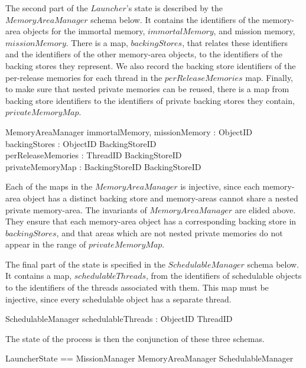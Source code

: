The second part of the $Launcher$'s state is described by the
$MemoryAreaManager$ schema below.
It contains the identifiers of the memory-area objects for the
immortal memory, $immortalMemory$, and mission memory,
$missionMemory$.
There is a map, $backingStores$, that relates these identifiers and
the identifiers of the other memory-area objects, to the identifiers
of the backing stores they represent.
We also record the backing store identifiers of the per-release
memories for each thread in the $perReleaseMemories$ map.
Finally, to make sure that nested private memories can be reused,
there is a map from backing store identifiers to the identifiers of
private backing stores they contain, $privateMemoryMap$.
\begin{schema}{MemoryAreaManager}
  immortalMemory, missionMemory : ObjectID \\
  backingStores : ObjectID \finj BackingStoreID \\
  perReleaseMemories : ThreadID \finj BackingStoreID \\
  privateMemoryMap : BackingStoreID \finj BackingStoreID
\where
  \cdots
\end{schema}
Each of the maps in the $MemoryAreaManager$ is injective, since each
memory-area object has a distinct backing store and memory-areas
cannot share a nested private memory-area.
The invariants of $MemoryAreaManager$ are elided above. 
They ensure that each memory-area object has a corresponding backing
store in $backingStores$, and that areas which are not nested private
memories do not appear in the range of $privateMemoryMap$.

The final part of the state is specified in the $SchedulableManager$
schema below.
It contains a map, $schedulableThreads$, from the identifiers of
schedulable objects to the identifiers of the threads associated with
them.
This map must be injective, since every schedulable object has a
separate thread.
\begin{schema}{SchedulableManager}
  schedulableThreads : ObjectID \finj ThreadID
\end{schema}

The state of the process is then the conjunction of these three
schemas.
\begin{circusaction}
  \circstate LauncherState == MissionManager \land MemoryAreaManager \land SchedulableManager
\end{circusaction}

